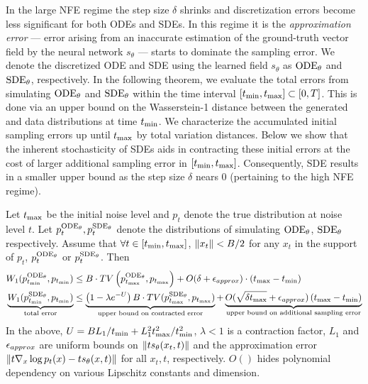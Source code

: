 In the large NFE regime the step size $\delta$ shrinks and discretization errors become less significant for both ODEs and SDEs. In this regime it is the \textit{approximation error} — error arising from an inaccurate estimation of the ground-truth vector field by the neural network $s_\theta$ — starts to dominate the sampling error. We denote the discretized ODE and SDE using the learned field $s_\theta$ as ${\textrm{ODE}_\theta}$ and ${\textrm{SDE}_\theta}$, respectively. In the following theorem, we evaluate the total errors from simulating ${\textrm{ODE}_\theta}$ and ${\textrm{SDE}_\theta}$ within the time interval $[t_{\textrm{min}}, t_{\textrm{max}}] \subset [0,T]$. This is done via an upper bound on the Wasserstein-1 distance between the generated and data distributions at time $t_{\textrm{min}}$. We characterize the accumulated initial sampling errors up until $t_{\textrm{max}}$ by total variation distances. Below we show that the inherent stochasticity of SDEs aids in contracting these initial errors at the cost of larger additional sampling error in $[t_{\textrm{min}}, t_{\textrm{max}}]$. Consequently, SDE results in a smaller upper bound as the step size $\delta$ nears $0$ (pertaining to the high NFE regime).

\begin{theorem}[Informal]
\label{thm1_informal}
    Let $t_{\textrm{max}}$ be the initial noise level and 
    $p_t$ denote the true distribution at noise level $t$. Let $p^{{\textrm{ODE}_\theta}}_t, p^{{\textrm{SDE}_\theta}}_{t}$ denote the distributions of simulating ${\textrm{ODE}_\theta}$, ${\textrm{SDE}_\theta}$ respectively. Assume that $\forall t \in  [t_{\textrm{min}}, t_{\textrm{max}}]$, $\left\| x_t \right\| < B/2$ for any $x_t$ in the support of $p_t$, $p^{{\textrm{ODE}_\theta}}_t$ or $p^{{\textrm{SDE}_\theta}}_{t}$. Then
    {\footnotesize
    \begin{align*}
        & W_1(p^{{\textrm{ODE}_\theta}}_{t_{\textrm{min}}}, p_{t_{\textrm{min}}}) \leq B \cdot TV\left( p^{{\textrm{ODE}_\theta}}_{t_{\textrm{max}}}, p_{t_{\textrm{max}}} \right) + O(\delta+{\epsilon_{approx}}) \cdot \left( t_{\textrm{max}} - t_{\textrm{min}} \right)\\
        & \underbrace{W_1(p^{{\textrm{SDE}_\theta}}_{t_{\textrm{min}}}, p_{t_{\textrm{min}}})}_{\textrm{total error}} \leq \underbrace{\left( 1 - \lambda e^{-U} \right)  B \cdot TV(p^{{\textrm{SDE}_\theta}}_{t_{\textrm{max}}}, p_{t_{\textrm{max}}})}_{\textrm{upper bound on contracted error}} + \underbrace{O(\sqrt{\delta t_{\textrm{max}}} + {\epsilon_{approx}}) \left( t_{\textrm{max}} - t_{\textrm{min}} \right)}_{\textrm{upper bound on additional sampling error}}
    \end{align*}}
    In the above, {\footnotesize $U=BL_1/t_{\textrm{min}} +L_1^2 t_{\textrm{max}}^2 / t_{\textrm{min}}^2$}, $\lambda < 1$ is a contraction factor, $L_1$ and ${\epsilon_{approx}}$ are uniform bounds on $\left\| ts_{\theta}(x_t,t) \right\|$ and the approximation error $\left\| t\nabla_x \log p_t(x) - ts_\theta(x,t) \right\|$ for all $x_t,t$, respectively. $O()$ hides polynomial dependency on various Lipschitz constants and dimension.
\end{theorem}

